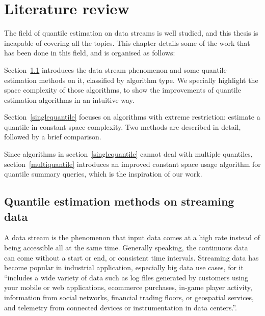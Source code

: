 % 



% 
\chapter{Literature review}
\label{ch: literature_review}


The field of quantile estimation on data streams is well studied, and this thesis is incapable of covering all the topics.
This chapter details some of the work that has been done in this field, and is organised as follows:

Section~\ref{streamingdata} introduces the data stream phenomenon and some quantile estimation methods on it, classified by algorithm type. We specially highlight the space complexity of those algorithms, to show the improvements of quantile estimation algorithms in an intuitive way.

Section~\ref{singlequantile} focuses on algorithms with extreme restriction: estimate a quantile in constant space complexity. Two methods are described in detail, followed by a brief comparison.

Since algorithms in section~\ref{singlequantile} cannot deal with multiple quantiles, section~\ref{multiquantile} introduces an improved constant space usage algorithm for quantile summary queries, which is the inspiration of our work.

\section{Quantile estimation methods on streaming data}
\label{streamingdata}
A data stream is the phenomenon that input data comes at a high rate instead of being accessible all at the same time\cite{muthukrishnanDataStreamsAlgorithms2005}.
Generally speaking, the continuous data can come without a start or end, or consistent time intervals.
Streaming data has become popular in industrial application, especially big data use cases, for it
``includes a wide variety of data such as log files generated by customers using your mobile or web applications, ecommerce purchases, in-game player activity, information from social networks, financial trading floors, or geospatial services, and telemetry from connected devices or instrumentation in data centers.''\cite{WhatStreamingData}.

